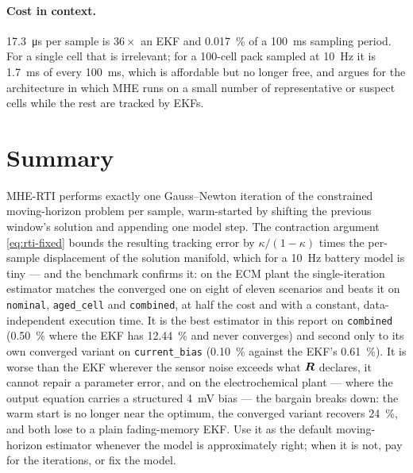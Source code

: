\paragraph{Cost in context.}  \SI{17.3}{\micro\second} per sample is $36\times$ an EKF and
\SI{0.017}{\percent} of a \SI{100}{\milli\second} sampling period.  For a single cell that is
irrelevant; for a \num{100}-cell pack sampled at \SI{10}{\hertz} it is \SI{1.7}{\milli\second} of
every \SI{100}{\milli\second}, which is affordable but no longer free, and argues for the
architecture in which MHE runs on a small number of representative or suspect cells while the rest
are tracked by EKFs.

\section{Summary}
MHE-RTI performs exactly one Gauss--Newton iteration of the constrained moving-horizon problem per
sample, warm-started by shifting the previous window's solution and appending one model step.  The
contraction argument \cref{eq:rti-fixed} bounds the resulting tracking error by
$\kappa/(1-\kappa)$ times the per-sample displacement of the solution manifold, which for a
\SI{10}{\hertz} battery model is tiny --- and the benchmark confirms it: on the ECM plant the
single-iteration estimator matches the converged one on eight of eleven scenarios and beats it on
\texttt{nominal}, \texttt{aged\_cell} and \texttt{combined}, at half the cost and with a constant,
data-independent execution time.  It is the best estimator in this report on \texttt{combined}
(\SI{0.50}{\percent} where the EKF has \SI{12.44}{\percent} and never converges) and second only to
its own converged variant on \texttt{current\_bias} (\SI{0.10}{\percent} against the EKF's
\SI{0.61}{\percent}).  It is worse than the EKF
wherever the sensor noise exceeds what $\bm{R}$ declares, it cannot repair a parameter error, and on
the electrochemical plant --- where the output equation carries a structured \SI{4}{\milli\volt}
bias --- the bargain breaks down: the warm start is no longer near the optimum, the converged
variant recovers \SI{24}{\percent}, and both lose to a plain fading-memory EKF.  Use it as the
default moving-horizon estimator whenever the model is approximately right; when it is not, pay for
the iterations, or fix the model.
